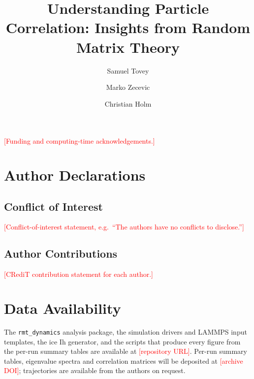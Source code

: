 \documentclass[aip,jcp,reprint,amsmath,amssymb,floatfix]{revtex4-2}
\begin{document}
\title{Understanding Particle Correlation: Insights from Random Matrix Theory}

\author{Samuel Tovey}
\author{Marko Zecevic}
\author{Christian Holm}

\begin{abstract}

\end{abstract}

\maketitle







\begin{acknowledgments}
\textcolor{red}{[Funding and computing-time acknowledgements.]}
\end{acknowledgments}

\section*{Author Declarations}
\subsection*{Conflict of Interest}
\textcolor{red}{[Conflict-of-interest statement, e.g.\ ``The authors have no conflicts to disclose.'']}

\subsection*{Author Contributions}
\textcolor{red}{[CRediT contribution statement for each author.]}

\section*{Data Availability}
\label{sec:data-and-availability}
The \texttt{rmt\_dynamics} analysis package, the simulation drivers and LAMMPS input templates, the ice Ih generator, and the scripts that produce every figure from the per-run summary tables are available at \textcolor{red}{[repository URL]}.
Per-run summary tables, eigenvalue spectra and correlation matrices will be deposited at \textcolor{red}{[archive DOI]}; trajectories are available from the authors on request.


\end{document}

